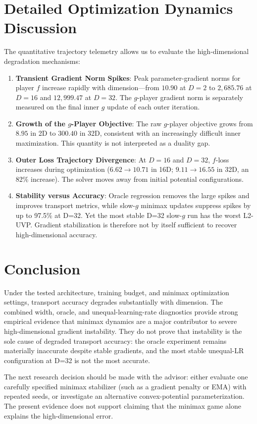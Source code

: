 \documentclass[11pt,a4paper]{article}
\begin{document}
\section{Detailed Optimization Dynamics Discussion}

The quantitative trajectory telemetry allows us to evaluate the high-dimensional degradation mechanisms:

\begin{enumerate}
    \item \textbf{Transient Gradient Norm Spikes}: Peak parameter-gradient norms for player $f$ increase rapidly with dimension---from $10.90$ at $D=2$ to $2,685.76$ at $D=16$ and $12,999.47$ at $D=32$. The $g$-player gradient norm is separately measured on the final inner $g$ update of each outer iteration.
    \item \textbf{Growth of the $g$-Player Objective}: The raw $g$-player objective grows from $8.95$ in 2D to $300.40$ in 32D, consistent with an increasingly difficult inner maximization. This quantity is not interpreted as a duality gap.
    \item \textbf{Outer Loss Trajectory Divergence}: At $D=16$ and $D=32$, $f$-loss increases during optimization ($6.62 \to 10.71$ in 16D; $9.11 \to 16.55$ in 32D, an 82\% increase). The solver moves away from initial potential configurations.
    \item \textbf{Stability versus Accuracy}: Oracle regression removes the large spikes and improves transport metrics, while slow-$g$ minimax updates suppress spikes by up to 97.5\% at D=32. Yet the most stable D=32 slow-$g$ run has the worst L2-UVP. Gradient stabilization is therefore not by itself sufficient to recover high-dimensional accuracy.
\end{enumerate}

\section{Conclusion}
Under the tested architecture, training budget, and minimax optimization settings, transport accuracy degrades substantially with dimension. The combined width, oracle, and unequal-learning-rate diagnostics provide strong empirical evidence that minimax dynamics are a major contributor to severe high-dimensional gradient instability. They do not prove that instability is the sole cause of degraded transport accuracy: the oracle experiment remains materially inaccurate despite stable gradients, and the most stable unequal-LR configuration at D=32 is not the most accurate.

The next research decision should be made with the advisor: either evaluate one carefully specified minimax stabilizer (such as a gradient penalty or EMA) with repeated seeds, or investigate an alternative convex-potential parameterization. The present evidence does not support claiming that the minimax game alone explains the high-dimensional error.
\end{document}
